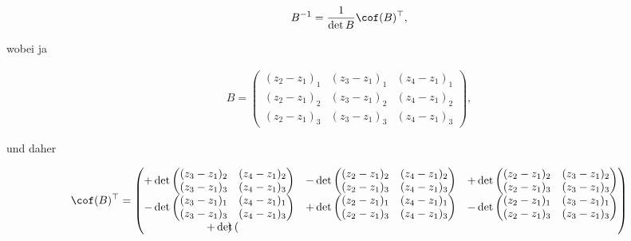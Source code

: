 \begin{solution}
\begin{align*}
  B^{-1}
  =
  \frac{1}{\det B} \cof(B)^\top,
\end{align*}

wobei ja

\begin{align*}
  B
  =
  \begin{pmatrix}
    (z_2 - z_1)_1 & (z_3 - z_1)_1 & (z_4 - z_1)_1 \\
    (z_2 - z_1)_2 & (z_3 - z_1)_2 & (z_4 - z_1)_2 \\
    (z_2 - z_1)_3 & (z_3 - z_1)_3 & (z_4 - z_1)_3
  \end{pmatrix},
\end{align*}

und daher

\begin{multline*}
  \cof(B)^\top
  =
  \begin{pmatrix}
    +
    \det
    \begin{pmatrix}
      (z_3 - z_1)_2 & (z_4 - z_1)_2 \\
      (z_3 - z_1)_3 & (z_4 - z_1)_3
    \end{pmatrix}
    &
    -
    \det
    \begin{pmatrix}
      (z_2 - z_1)_2 & (z_4 - z_1)_2 \\
      (z_2 - z_1)_3 & (z_4 - z_1)_3
    \end{pmatrix}
    &
    +
    \det
    \begin{pmatrix}
      (z_2 - z_1)_2 & (z_3 - z_1)_2 \\
      (z_2 - z_1)_3 & (z_3 - z_1)_3
    \end{pmatrix}
    \\
    -
    \det
    \begin{pmatrix}
      (z_3 - z_1)_1 & (z_4 - z_1)_1 \\
      (z_3 - z_1)_3 & (z_4 - z_1)_3
    \end{pmatrix}
    &
    +
    \det
    \begin{pmatrix}
      (z_2 - z_1)_1 & (z_4 - z_1)_1 \\
      (z_2 - z_1)_3 & (z_4 - z_1)_3
    \end{pmatrix}
    &
    -
    \det
    \begin{pmatrix}
      (z_2 - z_1)_1 & (z_3 - z_1)_1 \\
      (z_2 - z_1)_3 & (z_3 - z_1)_3
    \end{pmatrix}
    \\
    +
    \det
    \begin{pmatrix}

\end{pmatrix}
\end{pmatrix}
\end{multline*}
\end{solution}
